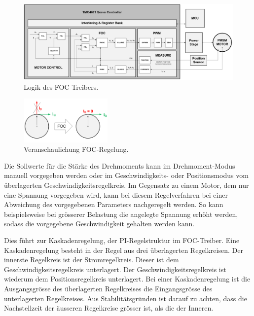 \begin{figure}[H]
	\centering
	\includegraphics[width=\textwidth]{graphics/FOC}
	\caption{Logik des FOC-Treibers. \cite[S.14]{trinamicmotion_control_gmbh__co_kg_tmc6200_2019}}
	\label{fig:FOC}
\end{figure}

\begin{figure}[H]
	\centering
	\includegraphics[width=0.4\textwidth]{graphics/FOC_2}
	\caption{Veranschaulichung FOC-Regelung. \cite[S.9]{trinamicmotion_control_gmbh__co_kg_tmc6200_2019}}
	\label{fig:FOC_2}
\end{figure}

Die Sollwerte für die Stärke des Drehmoments kann im Drehmoment-Modus manuell vorgegeben werden oder im Geschwindigkeits- oder Positionsmodus vom überlagerten Geschwindigkeitsregelkreis. Im Gegensatz zu einem Motor, dem nur eine Spannung vorgegeben wird, kann bei diesem Regelverfahren bei einer Abweichung des vorgegebenen Parameters nachgeregelt werden. So kann beispielsweise bei grösserer Belastung die angelegte Spannung erhöht werden, sodass die vorgegebene Geschwindigkeit gehalten werden kann.

Dies führt zur Kaskadenregelung, der PI-Regelstruktur im FOC-Treiber. Eine Kaskadenregelung besteht in der Regel aus drei überlagerten Regelkreisen. Der innerste Regelkreis ist der Stromregelkreis. Dieser ist dem Geschwindigkeitsregelkreis unterlagert. Der Geschwindigkeitsregelkreis ist wiederum dem Positionsregelkreis unterlagert. Bei einer Kaskadenregelung ist die Ausgangsgrösse des überlagerten Regelkreises die Eingangsgrösse des unterlagerten Regelkreises. Aus Stabilitätsgründen ist darauf zu achten, dass die Nachstellzeit der äusseren Regelkreise grösser ist, als die der Inneren.

